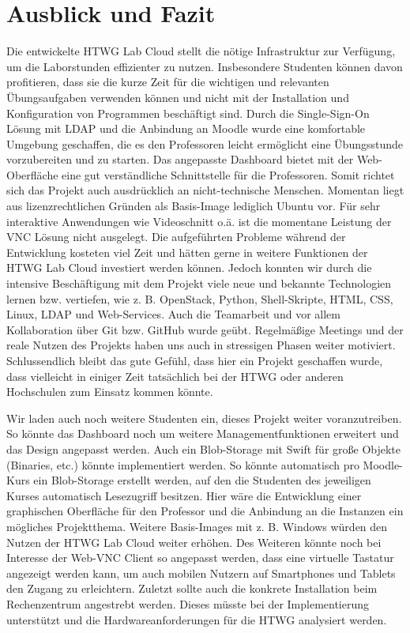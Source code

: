 \chapter{Ausblick und Fazit}

Die entwickelte HTWG Lab Cloud stellt die nötige Infrastruktur zur Verfügung, um die Laborstunden effizienter zu nutzen.
Insbesondere Studenten können davon profitieren, dass sie die kurze Zeit für die wichtigen und relevanten Übungsaufgaben verwenden können und nicht mit der Installation und Konfiguration von Programmen beschäftigt sind.
Durch die Single-Sign-On Lösung mit LDAP und die Anbindung an Moodle wurde eine komfortable Umgebung geschaffen, die es den Professoren leicht ermöglicht eine Übungsstunde vorzubereiten und zu starten.
Das angepasste Dashboard bietet mit der Web-Oberfläche eine gut verständliche Schnittstelle für die Professoren. 
Somit richtet sich das Projekt auch ausdrücklich an nicht-technische Menschen.
Momentan liegt aus lizenzrechtlichen Gründen als Basis-Image lediglich Ubuntu vor. 
Für sehr interaktive Anwendungen wie Videoschnitt o.ä. ist die momentane Leistung der VNC Lösung nicht ausgelegt. 
Die aufgeführten Probleme während der Entwicklung kosteten viel Zeit und hätten gerne in weitere Funktionen der HTWG Lab Cloud investiert werden können.
Jedoch konnten wir durch die intensive Beschäftigung mit dem Projekt viele neue und bekannte Technologien lernen bzw. vertiefen, wie z. B. OpenStack, Python, Shell-Skripte, HTML, CSS, Linux, LDAP und Web-Services.
Auch die Teamarbeit und vor allem Kollaboration über Git bzw. GitHub wurde geübt. 
Regelmäßige Meetings und der reale Nutzen des Projekts haben uns auch in stressigen Phasen weiter motiviert.
Schlussendlich bleibt das gute Gefühl, dass hier ein Projekt geschaffen wurde, dass vielleicht in einiger Zeit tatsächlich bei der HTWG oder anderen Hochschulen zum Einsatz kommen könnte.

Wir laden auch noch weitere Studenten ein, dieses Projekt weiter voranzutreiben. 
So könnte das Dashboard noch um weitere Managementfunktionen erweitert und das Design angepasst werden.
Auch ein Blob-Storage mit Swift für große Objekte (Binaries, etc.) könnte implementiert werden.
So könnte automatisch pro Moodle-Kurs ein Blob-Storage erstellt werden, auf den die Studenten des jeweiligen Kurses automatisch Lesezugriff besitzen.
Hier wäre die Entwicklung einer graphischen Oberfläche für den Professor und die Anbindung an die Instanzen ein mögliches Projektthema.
Weitere Basis-Images mit z. B. Windows würden den Nutzen der HTWG Lab Cloud weiter erhöhen.
Des Weiteren könnte noch bei Interesse der Web-VNC Client so angepasst werden, dass eine virtuelle Tastatur angezeigt werden kann, um auch mobilen Nutzern auf Smartphones und Tablets den Zugang zu erleichtern.
Zuletzt sollte auch die konkrete Installation beim Rechenzentrum angestrebt werden.
Dieses müsste bei der Implementierung unterstützt und die Hardwareanforderungen für die HTWG analysiert werden.

